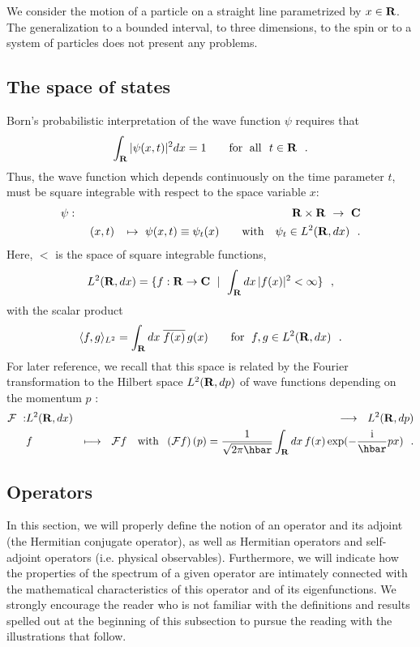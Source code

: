\documentclass[12pt]{report}
\begin{document}
We consider the motion of a particle on a straight line parametrized by 
$x \in {\bf R}$. The generalization to a bounded interval, to three
dimensions, to the spin or to a system of particles does not present
any problems.

\subsection{The space of states}
 
Born's probabilistic interpretation  
of the wave function $\psi$
requires that 
\[
\int _{{\bf R}} | \psi (x,t)|^2 dx =1 
\qquad {\rm for \ \; all} \ \ t \in {\bf R} 
\ \ .
\]
Thus, the wave function which depends continuously on 
the time parameter $t$, must be  
square integrable with respect to the space variable $x$:
\begin{eqnarray*}
\psi & : & {\bf R} \times {\bf R} \ \to \ {\bf C}
\\
& & \ (x, t) \ \ \, \mapsto \ \psi (x,t) \equiv \psi_t (x)
\qquad {\rm with} \quad \psi_t \in L ^2 ({\bf R} , dx )
\ \ .
\end{eqnarray*}
Here, $\lt$ is 
the space of square integrable functions,  
$$
\lt = \{ f: {\bf R} \to {\bf C} \ \mid \ \int_{{\bf R}} dx \,
| f(x) |^2 < \infty \}
\ \ ,
$$
with the scalar product
\begin{equation}
\label{ip}
\langle
f, g \rangle _{L^2} = \int_{{\bf R}} dx \; \overline{f(x)} \, g(x)
\qquad \mbox{for} \ \; f,g \in {L^2 ({{\bf R}},dx)}
\ \ .
\end{equation}
For later reference, we recall that 
this space is related by the Fourier transformation to the Hilbert
space 
$L^2 ({\bf R} , dp )$ of wave functions depending on the momentum  $p$ :
\begin{eqnarray}
\label{f}
{\cal F} \ : & \lt & \longrightarrow \ \ L^2 ( {\br}, dp)
\\
 & f & \longmapsto \ \  {\cal F} f
\quad {\rm with} \ \;
\left( {\cal F} f \right) (p)
= {1 \over \sqrt{2\pi \hbar}} \int_{\br} dx \, f(x) \,
{\rm exp} (-{\ri \over \hbar}px )
\ \ .
\nonumber
\end{eqnarray}
 



 
\subsection{Operators}

In this section, we will properly define the notion of an 
operator and its adjoint (the Hermitian conjugate operator), 
as well as Hermitian operators 
and self-adjoint operators (i.e. physical 
observables).
Furthermore, we will indicate how the properties of the spectrum 
of a given operator are intimately connected 
with the mathematical characteristics of this operator and 
of its eigenfunctions.   
 We strongly encourage the 
reader who is not familiar with the 
definitions and results spelled out 
at the beginning of this subsection 
to pursue the reading 
with the illustrations that follow.  
\end{document}
